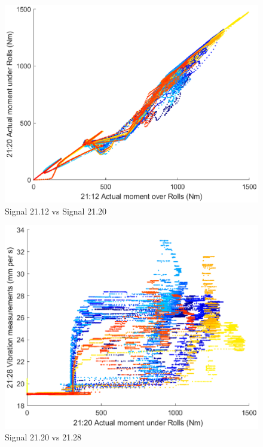 \documentclass{article}
\begin{document}
\begin{figure}[H]
    \centering
    \includegraphics[width=\textwidth, height=\textheight, keepaspectratio]{figures/Signal21_12vSignal21_20.eps}
    \caption{Signal 21.12 vs Signal 21.20}
    \label{fig:Signal21_12vSignal21_20}
\end{figure}	

\begin{figure}[H]
    \centering
    \includegraphics[width=\textwidth, height=\textheight, keepaspectratio]{figures/Signal21_20vSignal21_28.eps}
    \caption{Signal 21.20 vs 21.28}
    \label{fig:Signal21_20vSignal21_28}
\end{figure}	
	
\end{document}
